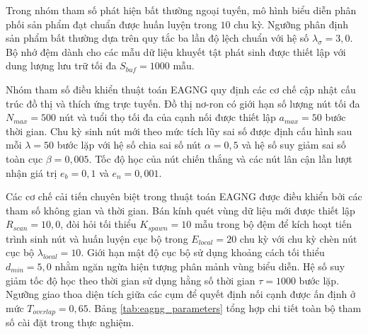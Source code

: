 Trong nhóm tham số phát hiện bất thường ngoại tuyến, mô hình biểu diễn phân phối sản phẩm đạt chuẩn được huấn luyện trong $10$ chu kỳ. Ngưỡng phân định sản phẩm bất thường dựa trên quy tắc ba lần độ lệch chuẩn với hệ số $\lambda_{\sigma} = 3{,}0$. Bộ nhớ đệm dành cho các mẫu dữ liệu khuyết tật phát sinh được thiết lập với dung lượng lưu trữ tối đa $S_{buf} = 1000$ mẫu.

Nhóm tham số điều khiển thuật toán EAGNG quy định các cơ chế cập nhật cấu trúc đồ thị và thích ứng trực tuyến. Đồ thị nơ-ron có giới hạn số lượng nút tối đa $N_{max} = 500$ nút và tuổi thọ tối đa của cạnh nối được thiết lập $a_{max} = 50$ bước thời gian. Chu kỳ sinh nút mới theo mức tích lũy sai số được định cấu hình sau mỗi $\lambda = 50$ bước lặp với hệ số chia sai số nút $\alpha = 0{,}5$ và hệ số suy giảm sai số toàn cục $\beta = 0{,}005$. Tốc độ học của nút chiến thắng và các nút lân cận lần lượt nhận giá trị $e_b = 0{,}1$ và $e_n = 0{,}001$.

Các cơ chế cải tiến chuyên biệt trong thuật toán EAGNG được điều khiển bởi các tham số không gian và thời gian. Bán kính quét vùng dữ liệu mới được thiết lập $R_{scan} = 10{,}0$, đòi hỏi tối thiểu $K_{spawn} = 10$ mẫu trong bộ đệm để kích hoạt tiến trình sinh nút và huấn luyện cục bộ trong $E_{local} = 20$ chu kỳ với chu kỳ chèn nút cục bộ $\lambda_{local} = 10$. Giới hạn mật độ cục bộ sử dụng khoảng cách tối thiểu $d_{min} = 5{,}0$ nhằm ngăn ngừa hiện tượng phân mảnh vùng biểu diễn. Hệ số suy giảm tốc độ học theo thời gian sử dụng hằng số thời gian $\tau = 1000$ bước lặp. Ngưỡng giao thoa diện tích giữa các cụm để quyết định nối cạnh được ấn định ở mức $T_{overlap} = 0{,}65$. Bảng \ref{tab:eagng_parameters} tổng hợp chi tiết toàn bộ tham số cài đặt trong thực nghiệm.

